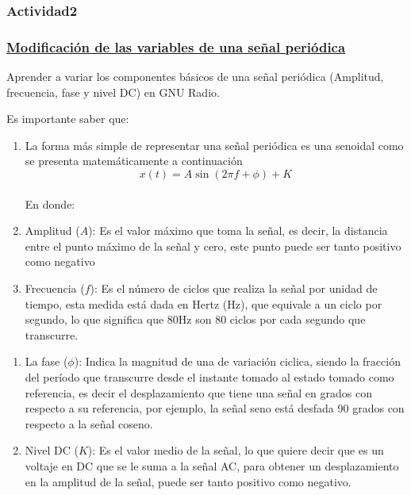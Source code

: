 \subsubsection{Actividad2}

\begin{frame}
	\frametitle{\underline{\textbf{Modificación de las variables de una señal periódica}}}
		
	Aprender a variar los componentes básicos de una señal periódica (Amplitud, frecuencia, fase y nivel DC) en GNU Radio.\vspace{2mm}
		
	Es importante saber que:
	
	\begin{enumerate}[1.]
	\item{La forma más simple de representar una señal periódica es una senoidal como se presenta matemáticamente a continuación}\\
	
	$$x(t)=A\sin(2 \pi f + \phi) + K$$\\
	
	En donde:\\
	
	\item{Amplitud ($A$): Es el valor máximo que toma la señal, es decir, la distancia entre el punto máximo de la señal y cero, este punto puede ser tanto positivo como negativo}\\
			
	\item{Frecuencia ($f$): Es el número de ciclos que realiza la señal por unidad de tiempo, esta medida está dada en Hertz (Hz), que equivale a un ciclo por segundo, lo que significa que 80Hz son 80 ciclos por cada segundo que transcurre.}\\

	\end{enumerate}
	\end{frame}
	
	
	\begin{frame}
	\begin{enumerate}[1.]

	\item{La fase ($\phi$): Indica la magnitud de una de variación ciclica, siendo la fracción del período que transcurre desde el instante tomado al estado tomado como referencia, es decir el desplazamiento que tiene una señal en grados con respecto a su referencia, por ejemplo, la señal seno está desfada 90 grados con respecto a la señal coseno.}\\
	
	\item{Nivel DC ($K$): Es el valor medio de la señal, lo que quiere decir que es un voltaje en DC que se le suma a la señal AC, para obtener un desplazamiento en la amplitud de la señal, puede ser tanto positivo como negativo.}\\

	\end{enumerate}
	\end{frame}
	
